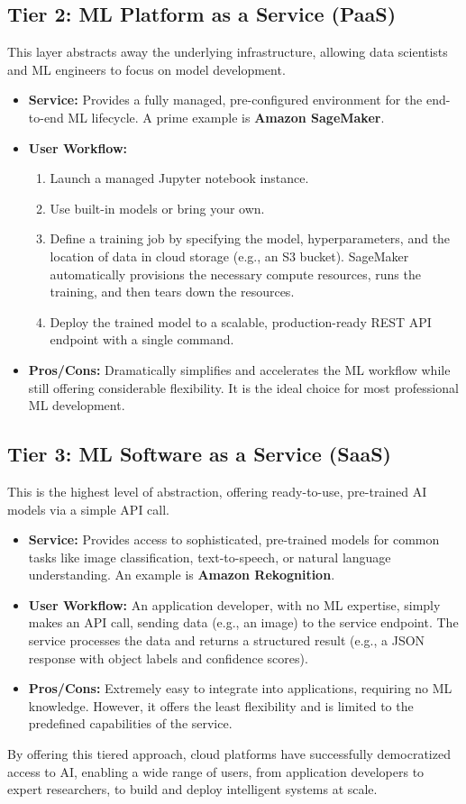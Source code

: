 \subsection{Tier 2: ML Platform as a Service (PaaS)}
This layer abstracts away the underlying infrastructure, allowing data scientists and ML engineers to focus on model development.
\begin{itemize}
    \item \textbf{Service:} Provides a fully managed, pre-configured environment for the end-to-end ML lifecycle. A prime example is \textbf{Amazon SageMaker}.
    \item \textbf{User Workflow:}
    \begin{enumerate}
        \item Launch a managed Jupyter notebook instance.
        \item Use built-in models or bring your own.
        \item Define a training job by specifying the model, hyperparameters, and the location of data in cloud storage (e.g., an S3 bucket). SageMaker automatically provisions the necessary compute resources, runs the training, and then tears down the resources.
        \item Deploy the trained model to a scalable, production-ready REST API endpoint with a single command.
    \end{enumerate}
    \item \textbf{Pros/Cons:} Dramatically simplifies and accelerates the ML workflow while still offering considerable flexibility. It is the ideal choice for most professional ML development.
\end{itemize}

\subsection{Tier 3: ML Software as a Service (SaaS)}
This is the highest level of abstraction, offering ready-to-use, pre-trained AI models via a simple API call.
\begin{itemize}
    \item \textbf{Service:} Provides access to sophisticated, pre-trained models for common tasks like image classification, text-to-speech, or natural language understanding. An example is \textbf{Amazon Rekognition}.
    \item \textbf{User Workflow:} An application developer, with no ML expertise, simply makes an API call, sending data (e.g., an image) to the service endpoint. The service processes the data and returns a structured result (e.g., a JSON response with object labels and confidence scores).
    \item \textbf{Pros/Cons:} Extremely easy to integrate into applications, requiring no ML knowledge. However, it offers the least flexibility and is limited to the predefined capabilities of the service.
\end{itemize}

By offering this tiered approach, cloud platforms have successfully democratized access to AI, enabling a wide range of users, from application developers to expert researchers, to build and deploy intelligent systems at scale.